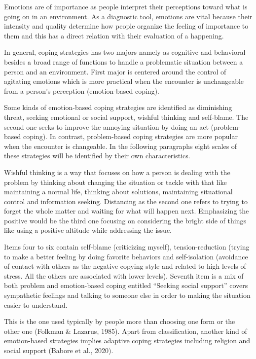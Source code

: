 \documentclass[
11pt, %
oneside, %
english, %
singlespacing, %
]{macthesis} %
\begin{document}
Emotions are of importance as people interpret their perceptions toward what is going on in an environment. As a diagnostic tool, emotions are vital because their intensity and quality determine how people organize the feeling of importance to them and this has a direct relation with their evaluation of a happening.

In general, coping strategies has two majors namely as cognitive and behavioral besides a broad range of functions to handle a problematic situation between a person and an environment. First major is centered around the control of agitating emotions which is more practical when the encounter is unchangeable from a person's perception (emotion-based coping).

Some kinds of emotion-based coping strategies are identified as diminishing threat, seeking emotional or social support, wishful thinking and self-blame. The second one seeks to improve the annoying situation by doing an act (problem-based coping). In contrast, problem-based coping strategies are more popular when the encounter is changeable. In the following paragraphs eight scales of these strategies will be identified by their own characteristics.

Wishful thinking is a way that focuses on how a person is dealing with the problem by thinking about changing the situation or tackle with that like maintaining a normal life, thinking about solutions, maintaining situational control and information seeking. Distancing as the second one refers to trying to forget the whole matter and waiting for what will happen next. Emphasizing the positive would be the third one focusing on considering the bright side of things like using a positive altitude while addressing the issue.

Items four to six contain self-blame (criticizing myself), tension-reduction (trying to make a better feeling by doing favorite behaviors and self-isolation (avoidance of contact with others as the negative copying style and related to high levels of stress. All the others are associated with lower levels). Seventh item is a mix of both problem and emotion-based coping entitled ``Seeking social support'' covers sympathetic feelings and talking to someone else in order to making the situation easier to understand.

This is the one used typically by people more than choosing one form or the other one (Folkman \& Lazarus, 1985). Apart from classification, another kind of emotion-based strategies implies adaptive coping strategies including religion and social support (Babore et al., 2020).
\end{document}
